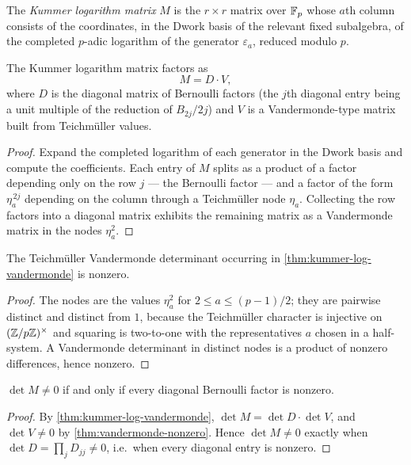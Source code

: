 \begin{definition}\label{def:concreteKummerLogMatrix}
  \leanok
The \emph{Kummer logarithm matrix} $M$ is the $r \times r$ matrix over
$\mathbb{F}_p$ whose $a$th column consists of the coordinates, in the Dwork basis
of the relevant fixed subalgebra, of the completed $p$-adic logarithm of
the generator $\varepsilon_a$, reduced modulo $p$.
\end{definition}

\begin{theorem}\label{thm:kummer-log-vandermonde}
  \leanok
The Kummer logarithm matrix factors as
\[
  M = D \cdot V,
\]
where $D$ is the diagonal matrix of Bernoulli factors (the $j$th diagonal
entry being a unit multiple of the reduction of $B_{2j}/2j$) and $V$ is a
Vandermonde-type matrix built from Teichm\"uller values.
\end{theorem}
\begin{proof}\leanok
Expand the completed logarithm of each generator in the Dwork basis and
compute the coefficients.  Each entry of $M$ splits as a product of a
factor depending only on the row $j$ --- the Bernoulli factor --- and a
factor of the form $\eta_a^{\,2j}$ depending on the column through a
Teichm\"uller node $\eta_a$.  Collecting the row factors into a diagonal
matrix exhibits the remaining matrix as a Vandermonde matrix in the nodes
$\eta_a^2$.
\end{proof}

\begin{theorem}\label{thm:vandermonde-nonzero}
  \leanok
The Teichm\"uller Vandermonde determinant occurring in
\cref{thm:kummer-log-vandermonde} is nonzero.
\end{theorem}
\begin{proof}\leanok
The nodes are the values $\eta_a^2$ for $2 \le a \le (p-1)/2$; they are
pairwise distinct and distinct from $1$, because the Teichm\"uller
character is injective on $(\mathbb{Z}/p\mathbb{Z})^\times$ and squaring is two-to-one with
the representatives $a$ chosen in a half-system.  A Vandermonde
determinant in distinct nodes is a product of nonzero differences, hence
nonzero.
\end{proof}

\begin{theorem}\label{thm:kummer-det-bernoulli-factor}
  \leanok
$\det M \ne 0$ if and only if every diagonal Bernoulli factor is nonzero.
\end{theorem}
\begin{proof}\leanok
By \cref{thm:kummer-log-vandermonde}, $\det M = \det D \cdot \det V$, and
$\det V \ne 0$ by \cref{thm:vandermonde-nonzero}.  Hence $\det M \ne 0$
exactly when $\det D = \prod_j D_{jj} \ne 0$, i.e.\ when every diagonal
entry is nonzero.
\end{proof}

